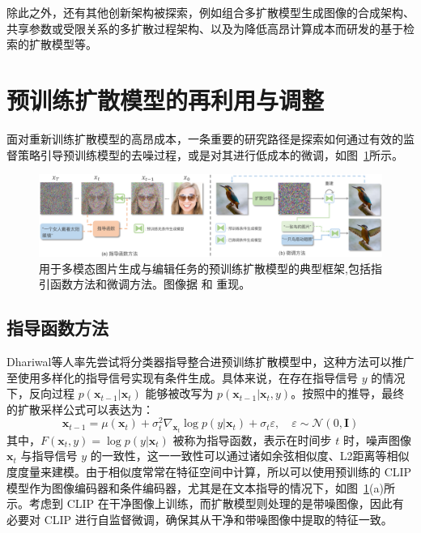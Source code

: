 除此之外，还有其他创新架构被探索，例如组合多扩散模型生成图像的合成架构\cite{liu2022compositional}、共享参数或受限关系的多扩散过程架构\cite{bar2023multidiffusion}、以及为降低高昂计算成本而研发的基于检索的扩散模型\cite{blattmann2022retrieval}等。
\section{预训练扩散模型的再利用与调整}
\label{pretrained_diffusion_models}

面对重新训练扩散模型的高昂成本，一条重要的研究路径是探索如何通过有效的监督策略引导预训练模型的去噪过程，或是对其进行低成本的微调，如图~\ref{diffusion_pretrained}所示。

\begin{figure}[h]
\centering
\includegraphics[width=1.0\linewidth]{figures/diffusion_pretrained.pdf}
\caption{用于多模态图片生成与编辑任务的预训练扩散模型的典型框架,包括指引函数方法和微调方法。图像据 \cite{liu2021more} 和 \cite{kawar2022imagic} 重现。}
\label{diffusion_pretrained}
\end{figure}


\subsection{指导函数方法}
\label{guidance_function_approach}

Dhariwal等人\cite{dhariwal2021diffusion}率先尝试将分类器指导整合进预训练扩散模型中，这种方法可以推广至使用多样化的指导信号实现有条件生成。具体来说，在存在指导信号 \(y\) 的情况下，反向过程 \(p(\mathbf{x}_{t-1}|\mathbf{x}_t)\) 能够被改写为 \(p(\mathbf{x}_{t-1}|\mathbf{x}_t, y)\)。按照\cite{dhariwal2021diffusion}中的推导，最终的扩散采样公式可以表达为：
\begin{equation}
    \mathbf{x}_{t-1} = \mu(\mathbf{x}_t) + \sigma_t^2 \nabla_{\mathbf{x}_t} \log p(y|\mathbf{x}_t) + \sigma_t \varepsilon, \quad \varepsilon \sim \mathcal{N}(0, \mathbf{I})
\end{equation}
其中，\(F(\mathbf{x}_t, y) = \log p(y|\mathbf{x}_t)\) 被称为指导函数，表示在时间步 \(t\) 时，噪声图像 \(\mathbf{x}_t\) 与指导信号 \(y\) 的一致性，这一一致性可以通过诸如余弦相似度、L2距离等相似度度量来建模\cite{liu2021more}。由于相似度常常在特征空间中计算，所以可以使用预训练的 CLIP 模型作为图像编码器和条件编码器，尤其是在文本指导的情况下，如图~\ref{diffusion_pretrained}(a)所示。考虑到 CLIP 在干净图像上训练，而扩散模型则处理的是带噪图像，因此有必要对 CLIP 进行自监督微调，确保其从干净和带噪图像中提取的特征一致\cite{liu2021more}。


